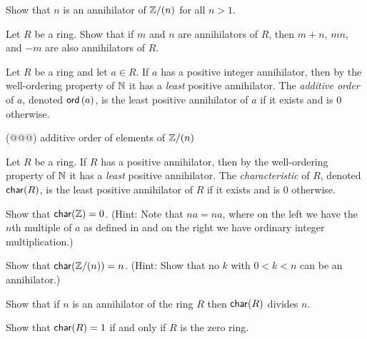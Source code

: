 \begin{exercise}
Show that \(n\) is an annihilator of \(\mathbb{Z}/(n)\) for all \(n > 1\).
\end{exercise}

\begin{exercise}
Let \(R\) be a ring.
Show that if \(m\) and \(n\) are annihilators of \(R\), then \(m+n\), \(mn\), and \(-m\) are also annihilators of \(R\).
\end{exercise}

\begin{dfn}
Let \(R\) be a ring and let \(a \in R\).
If \(a\) has a positive integer annihilator, then by the well-ordering property of \(\mathbb{N}\) it has a \emph{least} positive annihilator.
The \emph{additive order} of \(a\), denoted \(\mathsf{ord}\left(a\right)\), is the least positive annihilator of \(a\) if it exists and is \(0\) otherwise.
\end{dfn}

\begin{exercise}
(@@@) additive order of elements of \(\mathbb{Z}/(n)\)
\end{exercise}

\begin{dfn}[Characteristic] \label{dfn:characteristic}
Let \(R\) be a ring.
If \(R\) has a positive annihilator, then by the well-ordering property of \(\mathbb{N}\) it has a \emph{least} positive annihilator.
The \emph{characteristic} of \(R\), denoted \(\mathsf{char}(R)\), is the least positive annihilator of \(R\) if it exists and is 0 otherwise.
\end{dfn}

\begin{exercise}
Show that \(\mathsf{char}(\mathbb{Z}) = 0\).
(Hint: Note that \(na = na\), where on the left we have the \(n\)th multiple of \(a\) as defined in  and on the right we have ordinary integer multiplication.)
\end{exercise}

\begin{exercise}
Show that \(\mathsf{char}(\mathbb{Z}/(n)) = n\).
(Hint: Show that no \(k\) with \(0 < k < n\) can be an annihilator.)
\end{exercise}

\begin{exercise}
Show that if \(n\) is an annihilator of the ring \(R\) then \(\mathsf{char}(R)\) divides \(n\).
\end{exercise}

\begin{exercise}
Show that \(\mathsf{char}(R) = 1\) if and only if \(R\) is the zero ring.
\end{exercise}

